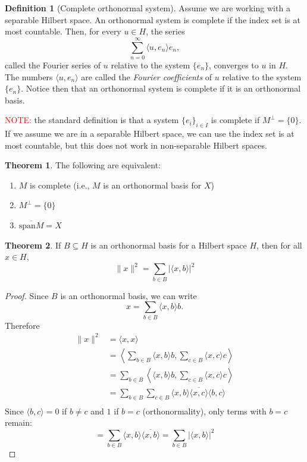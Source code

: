 \documentclass[11pt,a4paper]{article}
\theoremstyle{definition}
\newtheorem{definition}{Definition}[section]
\newtheorem{theorem}{Theorem}[section]
\begin{document}
\begin{definition}[Complete orthonormal system]\label{def:complete-ON-system}
Assume we are working with a separable Hilbert space. An orthonormal system is complete if the index set is at most countable. Then, for every 
$u \in H$, the series
\[
\sum_{n=0}^{\infty} \langle u, e_n\rangle e_n,
\]
called the Fourier series of $u$ relative to the system $\{e_n\}$,
converges to $u$ in $H$.  
The numbers $\langle u, e_n\rangle$ are called the \emph{Fourier coefficients}
of $u$ relative to the system $\{e_n\}$. Notice then that an orthonormal system is complete if it is an orthonormal basis.
\end{definition}
\noindent \textcolor{red}{NOTE:} the standard definition is that a system $\{e_i\}_{i \in I}$ is complete if $M^\perp = \{0\}$. If we assume we are in a separable Hilbert space, we can use the index set is at most countable, but this does not work in non-separable Hilbert spaces.


\newpage

\begin{theorem}
    The following are equivalent:
    \begin{enumerate}
        \item $M$ is complete (i.e., $M$ is an orthonormal basis for $X$)
        \item $M^\perp = \{0\}$
        \item $\overline{\text{span} M} = X$
    \end{enumerate}
\end{theorem}

\begin{theorem}
If $B \subseteq H$ is an orthonormal basis for a Hilbert space $H$, then for all $x \in H$,
\[
\|x\|^2 = \sum_{b \in B} |\langle x, b \rangle|^2
\]
\end{theorem}

\begin{proof}
Since $B$ is an orthonormal basis, we can write
\[
x = \sum_{b \in B} \langle x, b \rangle b.
\]
Therefore
\begin{align*}
\|x\|^2 &= \langle x, x \rangle \\
&= \left\langle \sum_{b \in B} \langle x, b \rangle b, \sum_{c \in B} \langle x, c \rangle c \right\rangle \\
&= \sum_{b \in B} \left\langle \langle x, b \rangle b, \sum_{c \in B} \langle x, c \rangle c \right\rangle \\
&= \sum_{b \in B} \sum_{c \in B} \langle x, b \rangle \overline{\langle x, c \rangle} \langle b, c \rangle \\
\end{align*}
Since $\langle b, c \rangle = 0$ if $b \neq c$ and $1$ if $b = c$ (orthonormality), only terms with $b = c$ remain:
\[
= \sum_{b \in B} \langle x, b \rangle \overline{\langle x, b \rangle}
= \sum_{b \in B} |\langle x, b \rangle|^2
\]
\end{proof}
\end{document}
